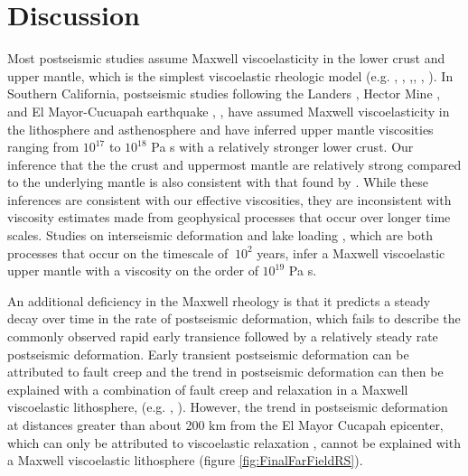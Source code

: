 \documentclass[12pt]{article}
\begin{document}
\section{Discussion}

Most postseismic studies assume Maxwell viscoelasticity in the lower crust and upper mantle, which is the simplest viscoelastic rheologic model (e.g. \cite{Nur1974}, \cite{Pollitz2000}, \cite{Hetland2003},\cite{Freed2006a}, \cite{Johnson2009}, \cite{Hearn2009}).  In Southern California, postseismic studies following the Landers \cite{Pollitz2000}, Hector Mine \cite{Pollitz2001}, and El Mayor-Cucuapah earthquake \cite{Spinler2015}, \cite{Rollins2015}, have assumed Maxwell viscoelasticity in the lithosphere and asthenosphere and have inferred upper mantle viscosities ranging from $10^{17}$ to $10^{18}$ Pa s with a relatively stronger lower crust. Our inference that the the crust and uppermost mantle are relatively strong compared to the underlying mantle is also consistent with that found by \cite{Freed2007a}.  While these inferences are consistent with our effective viscosities, they are inconsistent with viscosity estimates made from geophysical processes that occur over longer time scales. Studies on interseismic deformation \cite{Lundgren2009} and lake loading \cite{Luttrell2007}, which are both processes that occur on the timescale of $~10^2$ years, infer a Maxwell viscoelastic upper mantle with a viscosity on the order of $10^{19}$ Pa s. 

An additional deficiency in the Maxwell rheology is that it predicts a steady decay over time in the rate of postseismic deformation, which fails to describe the commonly observed rapid early transience followed by a relatively steady rate postseismic deformation.  Early transient postseismic deformation can be attributed to fault creep \cite{Savage2005a} and the trend in postseismic deformation can then be explained with a combination of fault creep and relaxation in a Maxwell viscoelastic lithosphere, (e.g. \cite{Hearn2009}, \cite{Johnson2009}). However, the trend in postseismic deformation at distances greater than about 200 km from the El Mayor Cucapah epicenter, which can only be attributed to viscoelastic relaxation \cite{Freed2007a}, cannot be explained with a Maxwell viscoelastic lithosphere (figure \ref{fig:FinalFarFieldRS}). 
\end{document}
